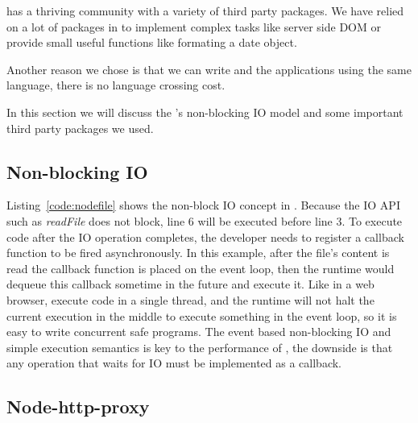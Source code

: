 \nodejs has a thriving community with a variety of third party packages.
We have relied on a lot of packages in \cb to implement complex tasks like
server side DOM or provide small useful functions like formating a date object.

Another reason we chose \nodejs is that we can write  \cb and the applications
using the same language, there is no language crossing cost.

In this section we will discuss the \nodejs's non-blocking IO model and some
important third party packages we used.

\subsection{Non-blocking IO}


Listing~\ref{code:nodefile} shows the non-block IO concept in \nodejs.
Because the IO API such as \emph{readFile} does not
block, line 6 will be executed before line 3.
To execute code after the IO operation completes,
the developer needs to register a callback function to be fired asynchronously.
In this example, after the file's content is read the callback function is placed on the
event loop,
then the runtime would dequeue this callback sometime in the future and execute it.
Like in a web browser, \nodejs execute \js code in a single thread,
and the runtime will not halt the current execution in the middle to execute something in
the event loop, so it is easy to write concurrent safe programs.
The event based non-blocking IO and simple execution semantics
is key to the performance of \nodejs,
the downside is that any operation that waits for IO must be implemented as a callback.

\subsection{Node-http-proxy}

